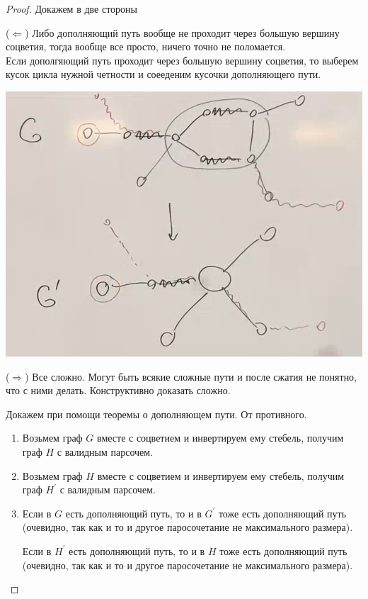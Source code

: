 \begin{proof}
    Докажем в две стороны

    ($\Leftarrow$) Либо дополняющий путь вообще не проходит через большую вершину соцветия, тогда вообще все просто, ничего точно не поломается.\\
    Если дополгяющий путь проходит через большую вершину соцветия, то выберем кусок цикла нужной четности и соееденим кусочки дополняющего пути.
    \begin{center}
        \includegraphics[scale=0.35]{img/parsoch_blossom_cut_proof_1}
    \end{center}

    ($\Rightarrow$) Все сложно.
    Могут быть всякие сложные пути и после сжатия не понятно, что с ними делать.
    Конструктивно доказать сложно.

    Докажем при помощи теоремы о дополняющем пути.
    От противного.
    \begin{enumerate}
        \item Возьмем граф $G$ вместе с соцветием и инвертируем ему стебель,
        получим граф $H$ с валидным парсочем.
        \item Возьмем граф $H$ вместе с соцветием и инвертируем ему стебель,
        получим граф $H^\prime$ с валидным парсочем.

        \item
        Если в $G$ есть дополняющий путь, то и в $G^\prime$ тоже есть дополняющий путь (очевидно, так как и то и другое паросочетание не максимального размера).

        Если в $H^\prime$ есть дополняющий путь, то и в $H$ тоже есть дополняющий путь (очевидно, так как и то и другое паросочетание не максимального размера).


\end{enumerate}
\end{proof}
